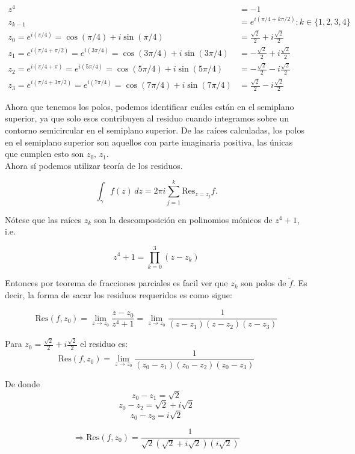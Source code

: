 \documentclass{article}
\begin{document}
\begin{align*}
    z^4 &= -1 \\
    z_{k-1} &= e^{i(\pi/4 + k\pi/2)} : k\in \{1,2,3,4\} \\
    z_0 = e^{i(\pi/4)} = \cos(\pi/4) + i\sin(\pi/4) &= \frac{\sqrt{2}}{2} + i\frac{\sqrt{2}}{2} \\
    z_1 = e^{i(\pi/4 + \pi/2)} = e^{i(3\pi/4)} = \cos(3\pi/4) + i\sin(3\pi/4) &= -\frac{\sqrt{2}}{2} + i\frac{\sqrt{2}}{2} \\
    z_2 = e^{i(\pi/4 + \pi)} = e^{i(5\pi/4)} = \cos(5\pi/4) + i\sin(5\pi/4) &= -\frac{\sqrt{2}}{2} - i\frac{\sqrt{2}}{2} \\
     z_3 = e^{i(\pi/4 + 3\pi/2)} = e^{i(7\pi/4)} = \cos(7\pi/4) + i\sin(7\pi/4) &= \frac{\sqrt{2}}{2} - i\frac{\sqrt{2}}{2} 
\end{align*}

Ahora que tenemos los polos, podemos identificar cuáles están en el semiplano superior, ya que solo esos contribuyen al residuo cuando integramos sobre un contorno semicircular en el semiplano superior. De las raíces calculadas, los polos en el semiplano superior son aquellos con parte imaginaria positiva, las únicas que cumplen esto son $z_0, \,z_1$.\\

Ahora sí podemos utilizar teoría de los residuos.

\[
\int_{\gamma} f(z) \, dz = 2\pi i \sum_{j=1}^k \text{Res}_{z = z_j} f.
\]

Nótese que las raíces $z_k$ son la descomposición en polinomios mónicos de $z^4+1$, i.e.

$$ z^4+1 = \prod_{k=0}^{3} (z-z_k) $$

Entonces por teorema de fracciones parciales es facil ver que $z_k$ son polos de $\tilde{f}$. Es decir, la forma de sacar los residuos requeridos es como sigue:

\[
\text{Res}(f, z_0) = \lim_{z \to z_0} \frac{z - z_0}{z^4 + 1} = \lim_{z \to z_0} \frac{1}{(z - z_1)(z - z_2)(z - z_3)}
\]

Para \( z_0 = \frac{\sqrt{2}}{2} + i\frac{\sqrt{2}}{2} \) el residuo es:
\[
\text{Res}(f, z_0) = \lim_{z \to z_0} \frac{1}{(z_0 - z_1)(z_0 - z_2)(z_0 - z_3)}
\]

De donde
\[
z_0 - z_1 = \sqrt{2}
\]
\[
z_0 - z_2 = \sqrt{2} + i\sqrt{2}
\]
\[
z_0 - z_3 = i\sqrt{2}
\]

\[
\Rightarrow \text{Res}(f, z_0) = \frac{1}{\sqrt{2}(\sqrt{2} + i\sqrt{2})(i\sqrt{2})}
\]
\end{document}
